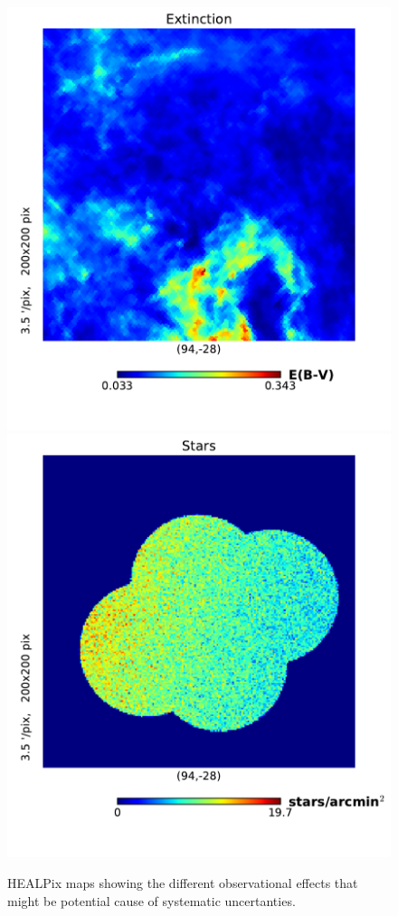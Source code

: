 \documentclass[\docopts]{\docclass}
\begin{document}
\begin{figure}
\centering
\includegraphics[width=0.9\columnwidth]{extinction_SFD.pdf}
\includegraphics[width=0.9\columnwidth]{stars_map_2048.pdf}
\caption{HEALPix maps showing the different observational effects that might be potential cause of systematic uncertanties.}
\label{fig:systematic_maps2}
\end{figure}
\end{document}
